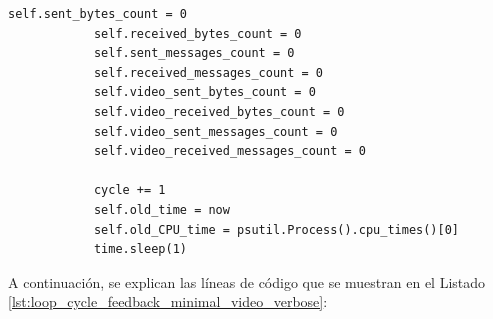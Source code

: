 \begin{lstlisting}[style=pythonstyle, caption={Método \texttt{loop\_cycle\_feedback()} de \textit{Minimal\_Video\_verbose}.}, label={lst:loop_cycle_feedback_minimal_video_verbose}]
            self.sent_bytes_count = 0
            self.received_bytes_count = 0
            self.sent_messages_count = 0
            self.received_messages_count = 0
            self.video_sent_bytes_count = 0
            self.video_received_bytes_count = 0
            self.video_sent_messages_count = 0
            self.video_received_messages_count = 0

            cycle += 1
            self.old_time = now
            self.old_CPU_time = psutil.Process().cpu_times()[0]
            time.sleep(1)
\end{lstlisting}
\vspace{\baselineskip}

A continuación, se explican las líneas de código que se muestran en el Listado \ref{lst:loop_cycle_feedback_minimal_video_verbose}:

